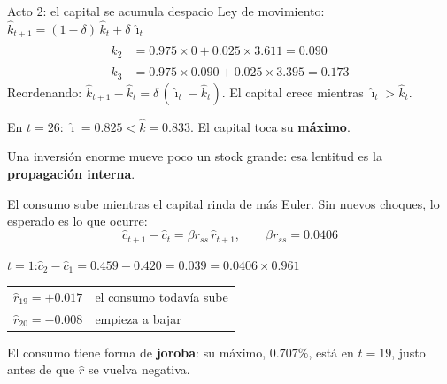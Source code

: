 \begin{frame}[label=acto2-capital]{Acto 2: el capital se acumula despacio}
  Ley de movimiento:\quad $\hat k_{t+1}=(1-\delta)\,\hat k_t+\delta\,\hat\imath_t$
  \vspace{0.15cm}
  \begin{align*}
    \hat k_2&=0.975\times0+0.025\times3.611=0.090\\
    \hat k_3&=0.975\times0.090+0.025\times3.395=0.173
  \end{align*}
  Reordenando: $\hat k_{t+1}-\hat k_t=\delta\,(\hat\imath_t-\hat k_t)$. El capital crece
  mientras $\hat\imath_t>\hat k_t$.\par
  \vspace{0.3cm}
  En $t=26$: $\hat\imath=0.825<\hat k=0.833$. El capital toca su \textbf{máximo}.\par
  \vspace{0.3cm}
  Una inversión enorme mueve poco un stock grande: esa lentitud es la
  \textbf{propagación interna}.
\end{frame}

\begin{frame}[label=acto2-consumo]{El consumo sube mientras el capital rinda de más}
  Euler. Sin nuevos choques, lo esperado es lo que ocurre:
  \[
  \hat c_{t+1}-\hat c_t=\beta r_{ss}\,\hat r_{t+1},\qquad \beta r_{ss}=0.0406
  \]
  \par\vspace{0.1cm}
  $t=1$:\quad $\hat c_2-\hat c_1=0.459-0.420=0.039=0.0406\times0.961$\par
  \vspace{0.3cm}
  \begin{tabular}{@{}ll@{}}
    $\hat r_{19}=+0.017$ & el consumo todavía sube\\
    $\hat r_{20}=-0.008$ & empieza a bajar
  \end{tabular}
  \par\vspace{0.3cm}
  El consumo tiene forma de \textbf{joroba}: su máximo, $0.707\%$, está en $t=19$,
  justo antes de que $\hat r$ se vuelva negativa.
\end{frame}

